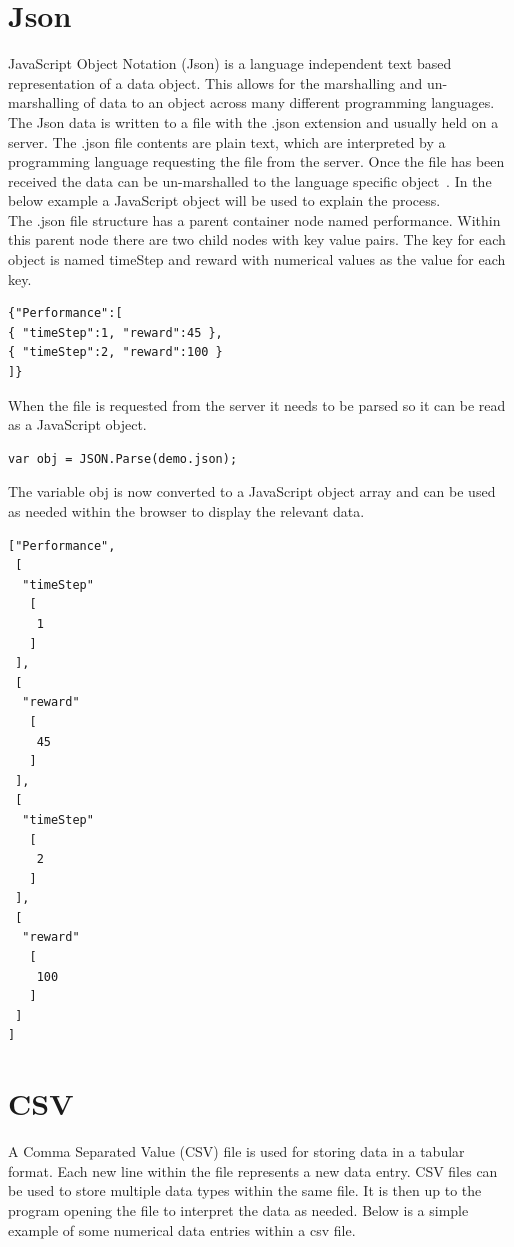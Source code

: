 \section{Json}
JavaScript Object Notation (Json) is a language independent text based representation of a data object. This allows for the marshalling and un-marshalling of data to an object across many different programming languages. The Json data is written to a file with the .json extension and usually held on a server. The .json file contents are plain text, which are interpreted by a programming language requesting the file from the server. Once the file has been received the data can be un-marshalled to the language specific object~\cite{JSON:online}. In the below example a JavaScript object will be used to explain the process.\\

The .json file structure has  a parent container node named performance. Within this parent node there are two child nodes with key value pairs. The key for each object is named timeStep and reward with numerical values as the value for each key.~\cite{JSONstring:online}\\
\begin{verbatim}
{"Performance":[
{ "timeStep":1, "reward":45 },
{ "timeStep":2, "reward":100 }
]}
\end{verbatim}
When the file is requested from the server it needs to be parsed so it can be read as a JavaScript object.

\begin{verbatim}
var obj = JSON.Parse(demo.json);
\end{verbatim}
The variable obj is now converted to a JavaScript object array and can be used as needed within the browser to display the relevant data.
\begin{verbatim}
["Performance",
 [
  "timeStep"
   [
    1
   ]
 ],
 [
  "reward"
   [
    45
   ]
 ],
 [
  "timeStep"
   [
    2
   ]
 ],
 [
  "reward"
   [
    100
   ]
 ]
]
\end{verbatim}
\section{CSV}
A Comma Separated Value (CSV) file is used for storing data in a tabular format. Each new line within the file represents a new data entry. CSV files can be used to store multiple data types within the same file. It is then up to the program opening the file to interpret the data as needed. Below is a simple example of some numerical data entries within a csv file.~\cite{CSVPython:online} 


